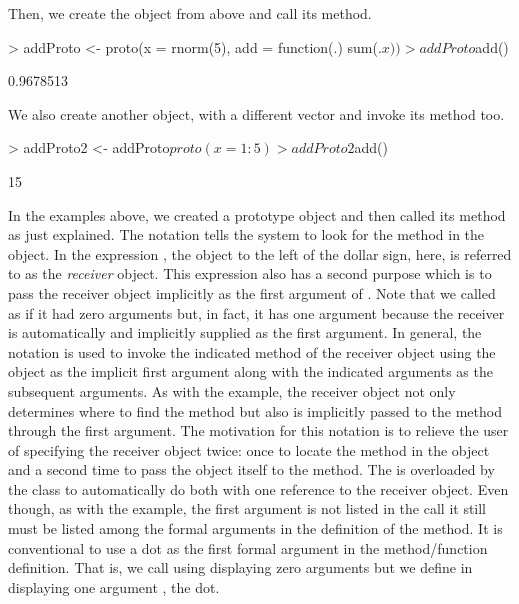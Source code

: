 \documentclass{Z}
\begin{document}
Then, we create the  object from above
and call its  method.
\begin{Schunk}
\begin{Sinput}
> addProto <- proto(x = rnorm(5), add = function(.) sum(.$x))
> addProto$add()
\end{Sinput}
\begin{Soutput}
[1] 0.9678513
\end{Soutput}
\end{Schunk}
We also create another object,  
with a different  vector and
invoke its  method too.
\begin{Schunk}
\begin{Sinput}
> addProto2 <- addProto$proto(x = 1:5)
> addProto2$add()
\end{Sinput}
\begin{Soutput}
[1] 15
\end{Soutput}
\end{Schunk}
In the examples above, we created a prototype object 
and then called its  method as just explained.  
The notation 
tells the system to look for the  method
in the  object.  In the expression ,
the  object to the left
of the dollar sign,  here, is referred to as the
\emph{receiver} object.  This expression
also has a second purpose which is to
pass the receiver object implicitly as the first argument of .
Note that we called  as if it had zero arguments but, in fact,
it has one argument because the receiver is automatically and implicitly
supplied as the first argument.  In general,
the notation  is
used to invoke the indicated method of the receiver object using the
object as the implicit first argument along with the indicated 
arguments as the subsequent arguments.  
As with the  example, the receiver
object not only determines where to find the
method but also is implicitly passed to the method through
the first argument.  The motivation for this notation
is to relieve the user of 
specifying the receiver object twice: 
once to locate the method in the object and a second
time to pass the object itself to the method.  
The \code{\$} is overloaded by the 
class to automatically do both with one reference to the receiver object.
Even though, as with the  example, the first
argument is not listed in the call 
it still must be listed among the formal arguments
in the definition of the method.  It 
is conventional to use
a dot  as the first formal argument in the method/function
definition.  That is, we call  using 
displaying zero arguments
but we define  in  displaying
one argument , the dot.
\end{document}
